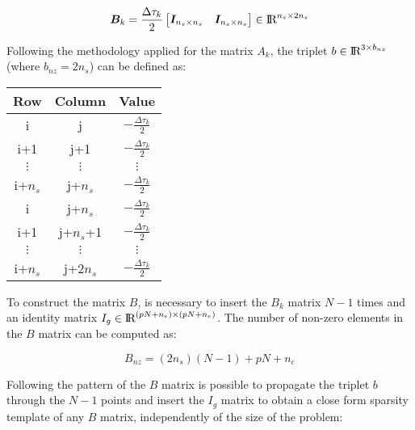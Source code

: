 \documentclass[12pt]{article}
\newcommand{\real}{\mbox{\rm I$\!$R}}
\begin{document}
\begin{eqnarray}
\bm{B}_k= \frac{\Delta \tau_k}{2}\begin{bmatrix}
\bm{I}_{n_s \times n_s} &\bm{I}_{n_s \times n_s}\\
\end{bmatrix} \in \real^{n_s \times 2n_s}
\end{eqnarray}

\noindent Following the methodology applied for the matrix $A_k$, the triplet $b \in \real^{3\times b_{nz}}$ (where $b_{nz}=2n_s$) can be defined as:

\begin{table}[h]
\begin{center}
\begin{tabular}{c|c|c}
Row    & Column        & Value \\ \hline
i      & j             & $-\frac{\Delta \tau_k}{2}$    \\
i+1    & j+1           & $-\frac{\Delta \tau_k}{2}$    \\
$\vdots$ & $\vdots$   &    $\vdots$     \\
i+$n_s$ & j+$n_s$        & $-\frac{\Delta \tau_k}{2}$    \\
i      & j+$n_s$  & $-\frac{\Delta \tau_k}{2}$     \\
i+1    & j+$n_s$+1 & $-\frac{\Delta \tau_k}{2}$     \\
 $\vdots$ & $\vdots$     &    $\vdots$     \\
i+$n_s$ & j+$2n_s$  & $-\frac{\Delta \tau_k}{2}$    
\end{tabular}
\end{center}
\end{table}

To construct the matrix $B$, is necessary to insert the $B_k$ matrix $N-1$ times and an identity matrix $I_g \in \real^{(pN+n_e) \times (pN+n_e) }$. The number of non-zero elements in the $B$ matrix can be computed as:

\begin{equation}
    B_{nz}=(2n_s)(N-1)+pN+n_e
\end{equation}

Following the pattern of the $B$ matrix is possible to propagate the triplet $b$ through the $N-1$ points and insert the $I_g$ matrix to obtain a close form sparsity template of any $B$ matrix, independently of the size of the problem:
\end{document}
